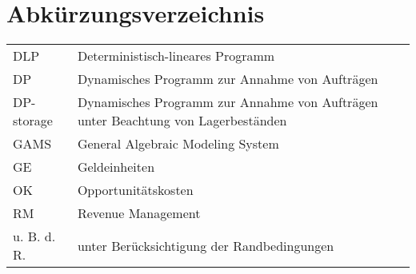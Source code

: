 \documentclass[a4paper,12pt,normalheadings,footexclude,headinclude,liststotoc,nochapterprefix,onecolumn,oneside,parskip,pointlessnumbers]{scrreprt}
\begin{document}
\chapter*{Abkürzungsverzeichnis}
\begin{table}[h!]
    \vspace*{-3mm}
    \hspace*{2mm}
  \renewcommand{\arraystretch}{1,5}
  \begin{flushleft}
    \begin{tabular}{lp{11.5cm}}  %
        DLP			& Deterministisch-lineares Programm\\
        DP  			 & Dynamisches Programm zur Annahme von Aufträgen\\
        DP-storage		    & Dynamisches Programm zur Annahme von Aufträgen unter Beachtung von Lagerbeständen\\
        GAMS 		& General Algebraic Modeling System\\
        GE & Geldeinheiten \\
     OK		    & Opportunitätskosten\\
     RM		    & Revenue Management\\
    u. B. d. R. & unter Berücksichtigung der Randbedingungen\\
	\end{tabular}
	\end{flushleft}
\end{table}

\end{document}
